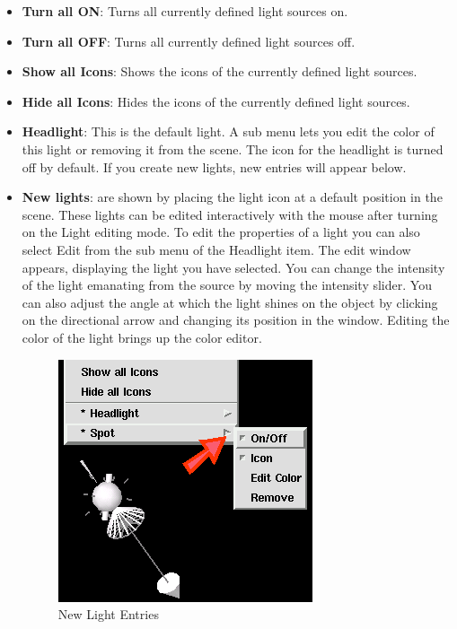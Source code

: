 \begin{itemize}
\item {\bf Turn all ON}: Turns all currently defined light sources on.

\item {\bf Turn all OFF}: Turns all currently defined light sources off.

\item {\bf Show all Icons}: Shows the icons of the currently defined light sources.

\item {\bf Hide all Icons}: Hides the icons of the currently defined light sources.

\item {\bf Headlight}: This is the default light. A sub menu lets you edit the color of this
light or removing it from the scene. The icon for the headlight is turned off by default. If you create new lights, new entries will appear below. 

\item {\bf New lights}: are shown by placing the light icon at a default position in the scene.
These lights can be edited interactively with the mouse after turning
on the Light editing mode. To edit the properties of a light you can
also select Edit from the sub menu of the Headlight item.
The edit window appears, displaying the light you have selected.
You can change the intensity of the light emanating from the source
by moving the intensity slider. You can also adjust the angle at which
the light shines on the object by clicking on the directional arrow and
changing its position in the window. Editing the color of the light
brings up the color editor. 

 \latexonly
 \begin{figure}[htp]
  \begin{center}
   \includegraphics[scale=0.7]{renderer/pict/image24}
   \caption{New Light Entries}
	\label{fig70}
  \end{center}
 \end{figure}
 \endlatexonly
 

\end{itemize}
